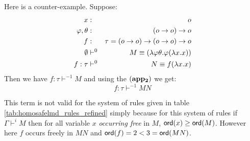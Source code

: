 Here is a counter-example. Suppose:
\begin{eqnarray*}
 x&:&o\\
 \varphi, \theta &:& (o \rightarrow o) \rightarrow o \\
 f &:& \tau = (o \rightarrow o) \rightarrow (o \rightarrow o) \rightarrow o \\
\emptyset &\vdash^0& M \equiv (\lambda \varphi \theta . \varphi (\lambda x . x)) \\
f:\tau &\vdash^0& N \equiv f (\lambda x . x)
\end{eqnarray*}
Then we have $ f:\tau \vdash^{-1} M $ and using the
$\mathbf{(app_2)}$ we get:
$$ f : \tau \vdash^{-1} M N$$

This term is not valid for the system of rules given in table \ref{tab:homosafelmd_rules_refined} simply because
for this system of rules if $\Gamma \vdash^i M$ then for all variable $x$ \emph{occurring free} in $M$, ${\sf ord}(x)\geq{\sf ord}(M)$. However
here $f$ occurs freely in $M N$ and ${\sf ord}(f) = 2 < 3 = {\sf ord}(M N)$.

